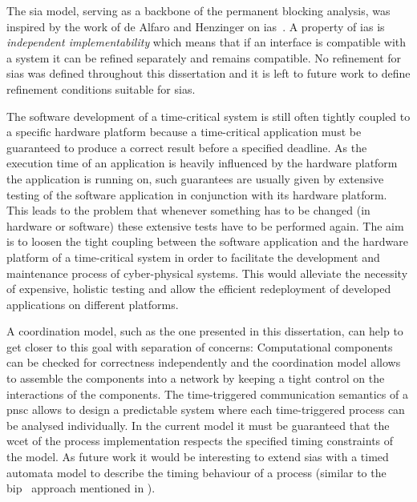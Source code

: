 The \gls{sia} model, serving as a backbone of the permanent blocking analysis, was inspired by the work of de Alfaro and Henzinger on \glspl{ia}~\cite{deAlfaro2001a}.
A property of \glspl{ia} is \emph{independent implementability} which means that if an interface is compatible with a system it can be refined separately and remains compatible.
No refinement for \glspl{sia} was defined throughout this dissertation and it is left to future work to define refinement conditions suitable for \glspl{sia}.

The software development of a time-critical system is still often tightly coupled to a specific hardware platform because a time-critical application must be guaranteed to produce a correct result before a specified deadline.
As the execution time of an application is heavily influenced by the hardware platform the application is running on, such guarantees are usually given by extensive testing of the software application in conjunction with its hardware platform.
This leads to the problem that whenever something has to be changed (in hardware or software) these extensive tests have to be performed again.
The aim is to loosen the tight coupling between the software application and the hardware platform of a time-critical system in order to facilitate the development and maintenance process of cyber-physical systems.
This would alleviate the necessity of expensive, holistic testing and allow the efficient redeployment of developed applications on different platforms.

A coordination model, such as the one presented in this dissertation, can help to get closer to this goal with separation of concerns:
Computational components can be checked for correctness independently and the coordination model allows to assemble the components into a network by keeping a tight control on the interactions of the components.
The time-triggered communication semantics of a \gls{pnsc} allows to design a predictable system where each time-triggered process can be analysed individually.
In the current model it must be guaranteed that the \gls{wcet} of the process implementation respects the specified timing constraints of the model.
As future work it would be interesting to extend \glspl{sia} with a timed automata model to describe the timing behaviour of a process (similar to the \gls{bip}~\cite{abdellatif2010} approach mentioned in \Sect{\ref{sect_related_coord_bip}}).

